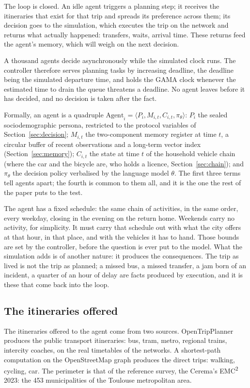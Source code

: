 The loop is closed. An idle agent triggers a planning step; it receives the itineraries that exist for that trip and spreads its preference across them; its decision goes to the simulation, which executes the trip on the network and returns what actually happened: transfers, waits, arrival time. These returns feed the agent's memory, which will weigh on the next decision.

A thousand agents decide asynchronously while the simulated clock runs. The controller therefore serves planning tasks by increasing deadline, the deadline being the simulated departure time, and holds the GAMA clock whenever the estimated time to drain the queue threatens a deadline. No agent leaves before it has decided, and no decision is taken after the fact.

Formally, an agent is a quadruple $\text{Agent}_i = \langle P_i, M_{i,t}, C_{i,t}, \pi_\theta \rangle$: $P_i$ the sealed sociodemographic persona, restricted to the protocol variables of Section~\ref{sec:decision}; $M_{i,t}$ the two-component memory register at time $t$, a circular buffer of recent observations and a long-term vector index (Section~\ref{sec:memory}); $C_{i,t}$ the state at time $t$ of the household vehicle chain (where the car and the bicycle are, who holds a licence, Section~\ref{sec:chain}); and $\pi_\theta$ the decision policy verbalised by the language model $\theta$. The first three terms tell agents apart; the fourth is common to them all, and it is the one the rest of the paper puts to the test.

The agent has a fixed schedule: the same chain of activities, in the same order, every weekday, closing in the evening on the return home. Weekends carry no activity, for simplicity. It must carry that schedule out with what the city offers at that hour, in that place, and with the vehicles it has to hand. Those bounds are set by the controller, before the question is ever put to the model. What the simulation adds is of another nature: it produces the consequences. The trip as lived is not the trip as planned; a missed bus, a missed transfer, a jam born of an incident, a quarter of an hour of delay are facts produced by execution, and it is these that come back into the loop.

\subsection{The itineraries offered}
\label{sec:field}

The itineraries offered to the agent come from two sources. OpenTripPlanner produces the public transport itineraries: bus, tram, metro, regional trains, intercity coaches, on the real timetables of the networks. A shortest-path computation on the OpenStreetMap graph produces the direct trips: walking, cycling, car. The perimeter is that of the reference survey, the Cerema's EMC\textsuperscript{2} 2023: the 453 municipalities of the Toulouse metropolitan area.

